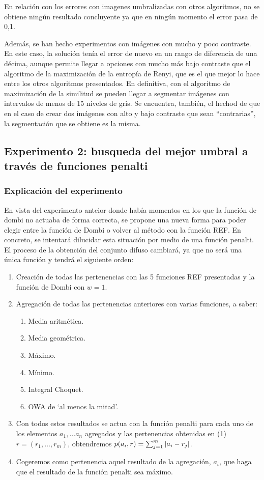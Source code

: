 \documentclass[main]{subfiles}
\begin{document}
En relación con los errores con imagenes umbralizadas con otros algoritmos, no se obtiene ningún resultado concluyente ya que en ningún momento el error pasa de 0,1.

Además, se han hecho experimentos con imágenes con mucho y poco contraste. En este caso, la solución tenía el error de nuevo en un rango de diferencia de una décima, aunque permite llegar a opciones con mucho más bajo contraste que el algoritmo de la maximización de la entropía de Renyi, que es el que mejor lo hace entre los otros algoritmos presentados. En definitiva, con el algoritmo de maximización de la similitud se pueden llegar a segmentar imágenes con intervalos de menos de 15 niveles de gris. Se encuentra, también, el hechod de que en el caso de crear dos imágenes con alto y bajo contraste que sean ``contrarias'', la segmentación que se obtiene es la misma.


\subsection{Experimento 2: busqueda del mejor umbral a través de funciones penalti\label{sec:exp2}}
\subsubsection{Explicación del experimento}
En vista del experimento anteior donde había momentos en los que la función de dombi no actuaba de forma correcta, se propone una nueva forma para poder elegir entre la función de Dombi o volver al método con la función REF. En concreto, se intentará dilucidar esta situación por medio de una función penalti. El proceso de la obtención del conjunto difuso cambiará, ya que no será una única función y tendrá el siguiente orden:
\begin{enumerate}
    \item Creación de todas las pertenencias con las 5 funciones REF presentadas y la función de Dombi con $w=1$.
    \item Agregación de todas las pertenencias anteriores con varias funciones, a saber:
        \begin{enumerate}
            \item Media aritmética.
            \item Media geométrica.
            \item Máximo.
            \item Mínimo.
            \item Integral Choquet.
            \item OWA de `al menos la mitad'. %
        \end{enumerate}
    \item Con todos estos resultados se actua con la función penalti para cada uno de los elementos $a_1,\dots a_n$ agregados y las pertenencias obtenidas en (1) $r=(r_1,\dots, r_m)$, obtendremos $p(a_i, r)=\sum_{j=1}^m \left\vert a_i-r_j\right\vert$.
    \item Cogeremos como pertenencia aquel resultado de la agregación, $a_i$, que haga que el resultado de la función penalti sea máximo.
\end{enumerate}
\end{document}
